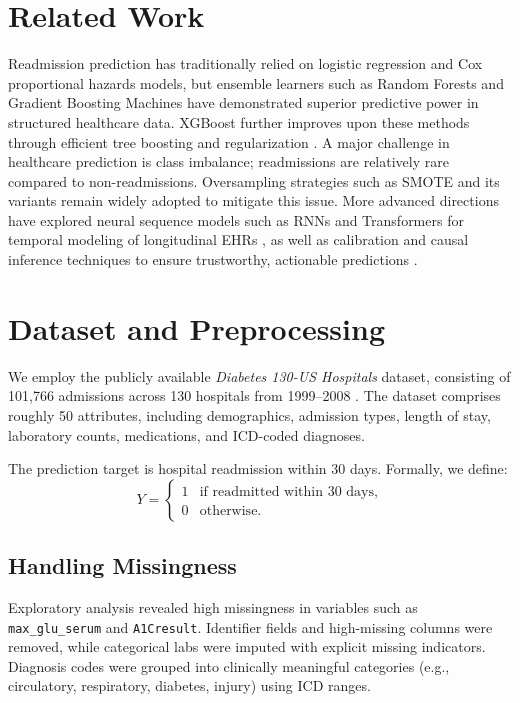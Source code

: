 
\section{Related Work}
Readmission prediction has traditionally relied on logistic regression and Cox proportional hazards models, but ensemble learners such as Random Forests \cite{breiman2001rf} and Gradient Boosting Machines \cite{friedman2001gbm} have demonstrated superior predictive power in structured healthcare data. XGBoost further improves upon these methods through efficient tree boosting and regularization \cite{chen2016xgboost}.  
A major challenge in healthcare prediction is class imbalance; readmissions are relatively rare compared to non-readmissions. Oversampling strategies such as SMOTE \cite{chawla2002smote} and its variants \cite{he2008adasyn} remain widely adopted to mitigate this issue. More advanced directions have explored neural sequence models such as RNNs and Transformers for temporal modeling of longitudinal EHRs \cite{choi2016doctor,vaswani2017attention}, as well as calibration and causal inference techniques to ensure trustworthy, actionable predictions \cite{zadrozny2001calibration,pearl2009causality}.


\section{Dataset and Preprocessing}
We employ the publicly available \emph{Diabetes 130-US Hospitals} dataset, consisting of 101,766 admissions across 130 hospitals from 1999–2008 \cite{diabetes_130-us_hospitals_for_years_1999-2008_296}. The dataset comprises roughly 50 attributes, including demographics, admission types, length of stay, laboratory counts, medications, and ICD-coded diagnoses.

The prediction target is hospital readmission within 30 days. Formally, we define:
\[
Y = \begin{cases}
1 & \text{if readmitted within 30 days}, \\
0 & \text{otherwise}.
\end{cases}
\]

\subsection{Handling Missingness}
Exploratory analysis revealed high missingness in variables such as \texttt{max\_glu\_serum} and \texttt{A1Cresult}. Identifier fields and high-missing columns were removed, while categorical labs were imputed with explicit missing indicators. Diagnosis codes were grouped into clinically meaningful categories (e.g., circulatory, respiratory, diabetes, injury) using ICD ranges.

